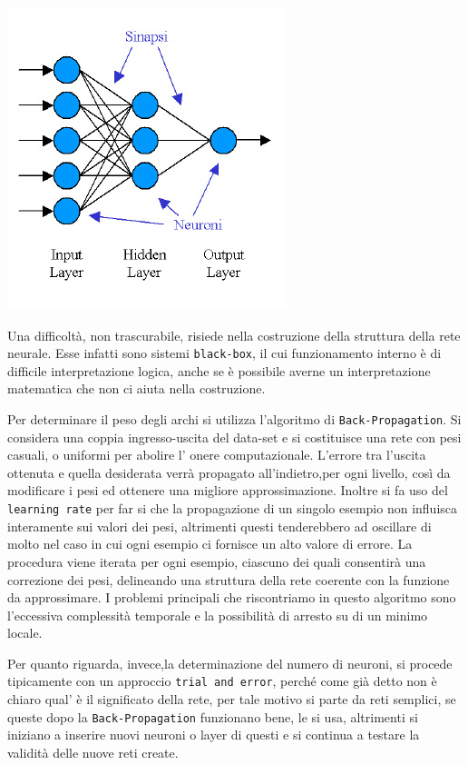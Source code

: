 {\begin{center}
				\includegraphics[scale=0.6]{RN-multilayer.jpg}
			\end{center}
			\par
			Una difficoltà, non trascurabile, risiede nella costruzione della struttura della rete neurale. Esse infatti sono sistemi \texttt{black-box}, il cui funzionamento interno è di difficile interpretazione logica, anche se è possibile averne un interpretazione matematica che non ci aiuta nella costruzione.
			\par
			Per determinare il peso degli archi si utilizza l'algoritmo di \texttt{Back-Propagation}. Si considera una coppia ingresso-uscita del data-set e si costituisce una rete con pesi casuali, o uniformi per abolire l' onere computazionale. L'errore tra l'uscita ottenuta e quella desiderata verrà propagato all'indietro,per ogni  livello, così da modificare i pesi ed ottenere una migliore approssimazione. Inoltre si fa uso del \texttt{learning rate} per far si che la propagazione di un singolo esempio non influisca interamente sui valori dei pesi, altrimenti questi tenderebbero ad oscillare di molto nel caso in cui ogni esempio ci fornisce un alto valore di errore. La procedura viene iterata per ogni esempio, ciascuno dei quali consentirà una correzione dei pesi, delineando una struttura della rete coerente con la funzione da approssimare. I problemi principali che riscontriamo in questo algoritmo sono l'eccessiva complessità temporale e la possibilità di arresto su di un minimo locale.\par
			Per quanto riguarda, invece,la determinazione del numero di neuroni, si procede tipicamente con un approccio \texttt{trial and error}, perché come già detto non è chiaro qual' è il significato della rete, per tale motivo si parte da reti semplici, se queste dopo la \texttt{Back-Propagation} funzionano bene, le si usa, altrimenti si iniziano a inserire nuovi neuroni o layer di questi e si continua a testare la validità delle nuove reti create.\par
}
